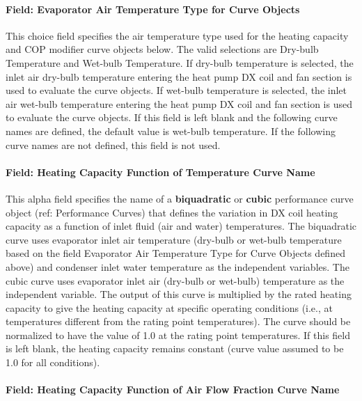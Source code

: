 \paragraph{Field: Evaporator Air Temperature Type for Curve Objects}\label{field-evaporator-air-temperature-type-for-curve-objects}

This choice field specifies the air temperature type used for the heating capacity and COP modifier curve objects below. The valid selections are Dry-bulb Temperature and Wet-bulb Temperature. If dry-bulb temperature is selected, the inlet air dry-bulb temperature entering the heat pump DX coil and fan section is used to evaluate the curve objects. If wet-bulb temperature is selected, the inlet air wet-bulb temperature entering the heat pump DX coil and fan section is used to evaluate the curve objects. If this field is left blank and the following curve names are defined, the default value is wet-bulb temperature. If the following curve names are not defined, this field is not used.

\paragraph{Field: Heating Capacity Function of Temperature Curve Name}\label{field-heating-capacity-function-of-temperature-curve-name-1}

This alpha field specifies the name of a \textbf{biquadratic} or \textbf{cubic} performance curve object (ref: Performance Curves) that defines the variation in DX coil heating capacity as a function of inlet fluid (air and water) temperatures. The biquadratic curve uses evaporator inlet air temperature (dry-bulb or wet-bulb temperature based on the field Evaporator Air Temperature Type for Curve Objects defined above) and condenser inlet water temperature as the independent variables. The cubic curve uses evaporator inlet air (dry-bulb or wet-bulb) temperature as the independent variable. The output of this curve is multiplied by the rated heating capacity to give the heating capacity at specific operating conditions (i.e., at temperatures different from the rating point temperatures). The curve should be normalized to have the value of 1.0 at the rating point temperatures. If this field is left blank, the heating capacity remains constant (curve value assumed to be 1.0 for all conditions).

\paragraph{Field: Heating Capacity Function of Air Flow Fraction Curve Name}\label{field-heating-capacity-function-of-air-flow-fraction-curve-name}

